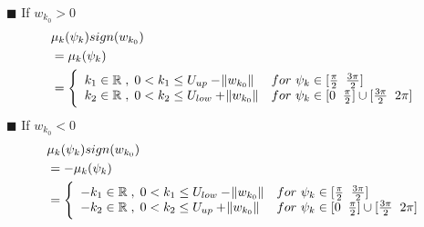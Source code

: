 \indent $\blacksquare$ If ${w_{k_0} > 0}$ 
\begin{equation} \label{adaptive_gain_positive_w0} %
\begin{split}
& \mu_k(\psi_{k})sign(w_{k_0}) \\
& = \mu_k(\psi_{k})\\
& = \twopartdef {k_1 \in \mathbb{R} \txtspc{,} 0 < k_1 \leq U_{up} - \norm{w_{k_0}}} 		{for ${ }$ \psi_{k} \in [\frac{\pi}{2} \txtspc{ } \frac{3\pi}{2}]} 
				{k_2 \in \mathbb{R} \txtspc{,} 0 < k_2 \leq U_{low} + \norm{w_{k_0}}} 		{for ${ }$ \psi_{k} \in [0 \txtspc{ } \frac{\pi}{2}] \cup [\frac{3\pi}{2} \txtspc{ } 2\pi]} \\
\end{split}
\end{equation}
%
\indent $\blacksquare$ If ${w_{k_0} < 0}$ 
\begin{equation} \label{adaptive_gain_negative_w0} %
\begin{split}
& \mu_k(\psi_{k})sign(w_{k_0}) \\
& = -\mu_k(\psi_{k})\\
& = \twopartdef {-k_1 \in \mathbb{R} \txtspc{,} 0 < k_1 \leq U_{low} - \norm{w_{k_0}}} 		{for ${ }$ \psi_{k} \in [\frac{\pi}{2}\txtspc{ } \frac{3\pi}{2}]} 
				{-k_2 \in \mathbb{R} \txtspc{,} 0 < k_2 \leq U_{up} + \norm{w_{k_0}}}			{for ${ }$ \psi_{k} \in [0\txtspc{ } \frac{\pi}{2}] \cup [\frac{3\pi}{2}\txtspc{ } 2\pi]} \\
\end{split}
\end{equation}

